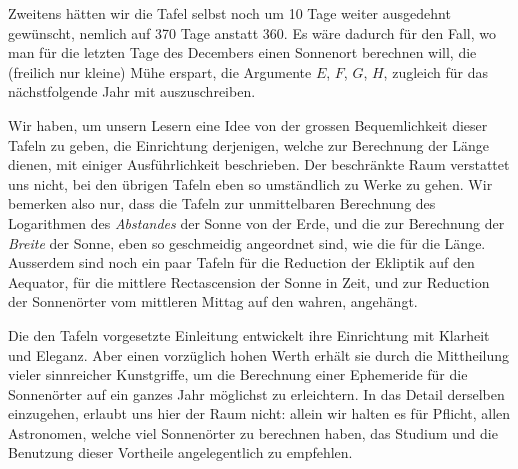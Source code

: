 Zweitens hätten wir die Tafel selbst noch um 10 Tage weiter ausgedehnt gewünscht, nemlich auf 370 Tage anstatt 360. Es wäre dadurch für den Fall, wo man für die letzten Tage des Decembers einen Sonnenort berechnen will, die (freilich nur kleine) Mühe erspart, die Argumente $E$, $F$, $G$, $H$, zugleich für das nächstfolgende Jahr mit auszuschreiben.

Wir haben, um unsern Lesern eine Idee von der grossen Bequemlichkeit dieser Tafeln zu geben, die Einrichtung derjenigen, welche zur Berechnung der Länge dienen, mit einiger Ausführlichkeit beschrieben. Der beschränkte Raum verstattet uns nicht, bei den übrigen Tafeln eben so umständlich zu Werke zu gehen. Wir bemerken also nur, dass die Tafeln zur unmittelbaren Berechnung des Logarithmen des \emph{Abstandes} der Sonne von der Erde, und die zur Berechnung der \emph{Breite} der Sonne, eben so geschmeidig angeordnet sind, wie die für die Länge. Ausserdem sind noch ein paar Tafeln für die Reduction der Ekliptik auf den Aequator, für die mittlere Rectascension der Sonne in Zeit, und zur Reduction der Sonnenörter vom mittleren Mittag auf den wahren, angehängt.

Die den Tafeln vorgesetzte Einleitung entwickelt ihre Einrichtung mit Klarheit und Eleganz. Aber einen vorzüglich hohen Werth erhält sie durch die Mittheilung vieler sinnreicher Kunstgriffe, um die Berechnung einer Ephemeride für die Sonnenörter auf ein ganzes Jahr möglichst zu erleichtern. In das Detail derselben einzugehen, erlaubt uns hier der Raum nicht: allein wir halten es für Pflicht, allen Astronomen, welche viel Sonnenörter zu berechnen haben, das Studium und die Benutzung dieser Vortheile angelegentlich zu empfehlen.
